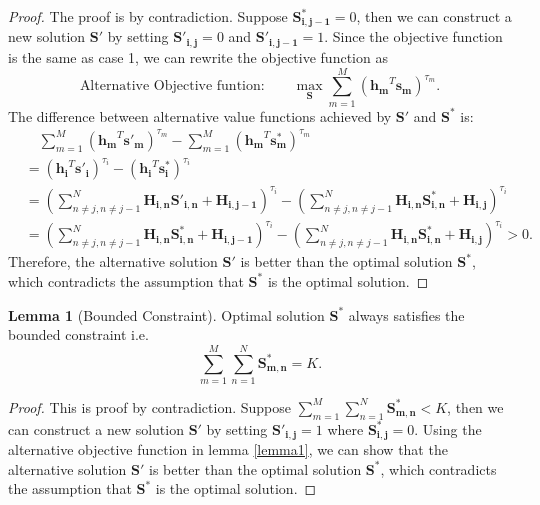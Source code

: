 \documentclass[12pt]{article}
\theoremstyle{definition}
\newtheorem{lemma}[theorem]{Lemma}
\newcommand{\matr}[1]{\mathbf{#1}} %
\begin{document}
\begin{sloppypar}
\begin{proof}
    The proof is by contradiction. Suppose $\matr{S^{\ast}_{i,j-1}} = 0$, then we can construct a new solution $\matr{S'}$ by setting $\matr{S'_{i,j}} = 0$ and $\matr{S'_{i,j-1}} = 1$. Since the objective function is the same as case 1, we can rewrite the objective function as 
    \begin{equation}
        \text{Alternative Objective funtion:} \qquad \max_{\matr{S}} \sum_{m=1}^{M}(\matr{h_m}^T \matr{s_m})^{\tau_m}.
    \end{equation}
    The difference between alternative value functions achieved by $\matr{S'}$ and $\matr{S^{\ast}}$ is:
    \begin{equation*}
    \begin{aligned}
        &\quad \sum_{m=1}^{M}(\matr{h_m}^T \matr{s'_m})^{\tau_m} - \sum_{m=1}^{M}(\matr{h_m}^T \matr{s^{\ast}_m})^{\tau_m} \\
        &= (\matr{h_i}^T \matr{s'_i})^{\tau_i} - (\matr{h_i}^T \matr{s^{\ast}_i})^{\tau_i} \\
        &= (\sum\limits_{n \neq j, n \neq j-1}^{N} \matr{H_{i,n}} \matr{S'_{i,n}}+\matr{H_{i,j-1}})^{\tau_i} - (\sum\limits_{n \neq j, n \neq j-1}^{N} \matr{H_{i,n}} \matr{S^{\ast}_{i,n}}+\matr{H_{i,j}})^{\tau_i}\\
        &= (\sum\limits_{n \neq j, n \neq j-1}^{N} \matr{H_{i,n}} \matr{S^{\ast}_{i,n}}+\matr{H_{i,j-1}})^{\tau_i} - (\sum\limits_{n \neq j, n \neq j-1}^{N} \matr{H_{i,n}} \matr{S^{\ast}_{i,n}}+\matr{H_{i,j}})^{\tau_i}> 0.
    \end{aligned}
    \end{equation*}
    Therefore, the alternative solution $\matr{S'}$ is better than the optimal solution $\matr{S^{\ast}}$, which contradicts the assumption that $\matr{S^{\ast}}$ is the optimal solution.
\end{proof}

\begin{lemma}[Bounded Constraint]\label{lemma2}
    Optimal solution $\matr{S^{\ast}}$ always satisfies the bounded constraint i.e.
    \begin{equation*}
        \sum_{m=1}^{M}\sum_{n=1}^{N}\matr{S^{\ast}_{m,n}} = K.
    \end{equation*}
\end{lemma}
\begin{proof}
    This is proof by contradiction. Suppose $\sum_{m=1}^{M}\sum_{n=1}^{N}\matr{S^{\ast}_{m,n}} < K$, then we can construct a new solution $\matr{S'}$ by setting $\matr{S'_{i,j}} = 1$ where $\matr{S^{\ast}_{i,j}} = 0$. Using the alternative objective function in lemma \ref{lemma1}, we can show that the alternative solution $\matr{S'}$ is better than the optimal solution $\matr{S^{\ast}}$, which contradicts the assumption that $\matr{S^{\ast}}$ is the optimal solution.
\end{proof}


\end{sloppypar}
\end{document}
